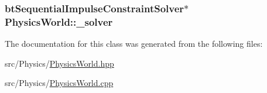 \subsubsection[{\texorpdfstring{\+\_\+solver}{_solver}}]{\setlength{\rightskip}{0pt plus 5cm}bt\+Sequential\+Impulse\+Constraint\+Solver$\ast$ Physics\+World\+::\+\_\+solver\hspace{0.3cm}{\ttfamily [private]}}\hypertarget{classPhysicsWorld_ae1c6ec226d583fe9812cae7f00fe5b1f}{}\label{classPhysicsWorld_ae1c6ec226d583fe9812cae7f00fe5b1f}


The documentation for this class was generated from the following files\+:\begin{DoxyCompactItemize}
\item 
src/\+Physics/\hyperlink{PhysicsWorld_8hpp}{Physics\+World.\+hpp}\item 
src/\+Physics/\hyperlink{PhysicsWorld_8cpp}{Physics\+World.\+cpp}\end{DoxyCompactItemize}
